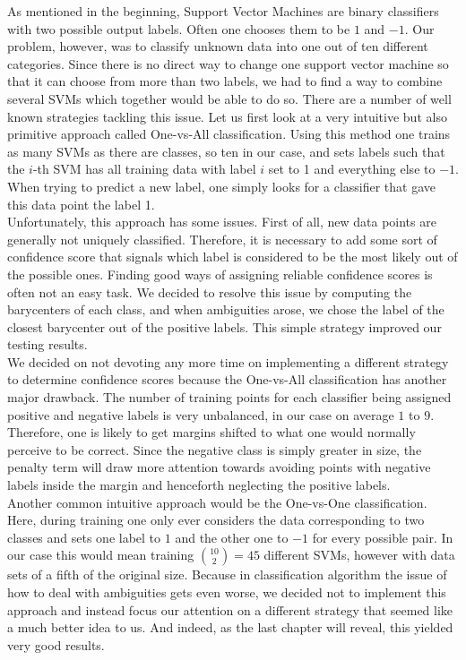 As mentioned in the beginning, Support Vector Machines are binary classifiers with two possible output labels. Often one chooses them to be $1$ and $-1$. Our problem, however, was to classify unknown data into one out of ten different categories. Since there is no direct way to change one support vector machine so that it can choose from more than two labels, we had to find a way to combine several SVMs which together would be able to do so. There are a number of well known strategies tackling this issue. Let us first look at a very intuitive but also primitive approach called One-vs-All classification. Using this method one trains as many SVMs as there are classes, so ten in our case, and sets labels such that the $i$-th SVM has all training data with label $i$ set to 1 and everything else to $-1$. When trying to predict a new label, one simply looks for a classifier that gave this data point the label 1. \\
Unfortunately, this approach has some issues. First of all, new data points are generally not uniquely classified. Therefore, it is necessary to add some sort of confidence score that signals which label is considered to be the most likely out of the possible ones. Finding good ways of assigning reliable confidence scores is often not an easy task. We decided to resolve this issue by computing the barycenters of each class, and when ambiguities arose, we chose the label of the closest barycenter out of the positive labels. This simple strategy improved our testing results.\\
We decided on not devoting any more time on implementing a different strategy to determine confidence scores because the One-vs-All classification has another major drawback. The number of training points for each classifier being assigned positive and negative labels is very unbalanced, in our case on average $1$ to $9$. Therefore, one is likely to get margins shifted to what one would normally perceive to be correct. Since the negative class is simply greater in size, the penalty term will draw more attention towards avoiding points with negative labels inside the margin and henceforth neglecting the positive labels.\\ 

Another common intuitive approach would be the One-vs-One classification. Here, during training one only ever considers the data corresponding to two classes and sets one label to $1$ and the other one to $-1$ for every possible pair. 
In our case this would mean training $\binom{10}{2} =45$ different SVMs, however with data sets of a fifth of the original size. Because in classification algorithm the issue of how to deal with ambiguities gets even worse, we decided not to implement this approach and instead focus our attention on a different strategy that seemed like a much better idea to us. And indeed, as the last chapter will reveal, this yielded very good results.

